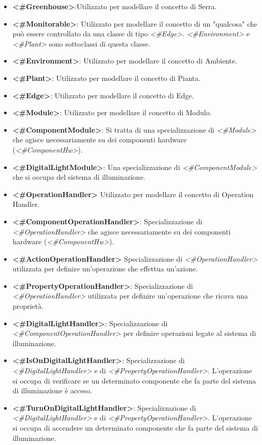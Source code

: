 \begin{itemize}
	\item \textbf{<\#Greenhouse>}:Utilizzato per modellare il concetto di Serra.
	\item \textbf{<\#Monitorable>}: Utilizzato per modellare il concetto di un "qualcosa" che può essere controllato da una classe di tipo \textit{<\#Edge>}. \textit{<\#Environment>} e \textit{<\#Plant>} sono sottoclassi di questa classe.
	\item \textbf{<\#Environment>}: Utilizzato per modellare il concetto di Ambiente.
	\item \textbf{<\#Plant>}: Utilizzato per modellare il concetto di Pianta.
	\item \textbf{<\#Edge>}: Utilizzato per modellare il concetto di Edge.
	\item \textbf{<\#Module>}: Utilizzato per modellare il concetto di Modulo.
	\item \textbf{<\#ComponentModule>}: Si tratta di una specializzazione di \textit{<\#Module>} che agisce necessariamente su dei componenti hardware (\textit{<\#ComponentHw>}).
	\item \textbf{<\#DigitalLightModule>}: Una specializzazione di \textit{<\#ComponentModule>} che si occupa del sistema di illuminazione.
	\item \textbf{<\#OperationHandler>}
	Utilizzato per modellare il concetto di Operation Handler.
	\item \textbf{<\#ComponentOperationHandler>}: Specializzazione di \textit{<\#OperationHandler>} che agisce necessariamente su dei componenti hardware (\textit{<\#ComponentHw>}).
	\item \textbf{<\#ActionOperationHandler>}
	Specializzazione di \textit{<\#OperationHandler>} utilizzata per definire un'operazione che effettua un'azione.
	\item \textbf{<\#PropertyOperationHandler>}: Specializzazione di \textit{<\#OperationHandler>} utilizzata per definire un'operazione che ricava una proprietà.
	\item \textbf{<\#DigitalLightHandler>}: Specializzazione di \textit{<\#ComponentOperationHandler>} per definire operazioni legate al sistema di illuminazione.
	\item \textbf{<\#IsOnDigitalLightHandler>}: Specializzazione di \textit{<\#DigitalLightHandler>} e di \textit{<\#PropertyOperationHandler>}. L'operazione si occupa di verificare se un determinato componente che fa parte del sistema di illuminazione è acceso.
	\item \textbf{<\#TurnOnDigitalLightHandler>}: Specializzazione di \textit{<\#DigitalLightHandler>} e di \textit{<\#PropertyOperationHandler>}. L'operazione si occupa di accendere un determinato componente che fa parte del sistema di illuminazione.

\end{itemize}
